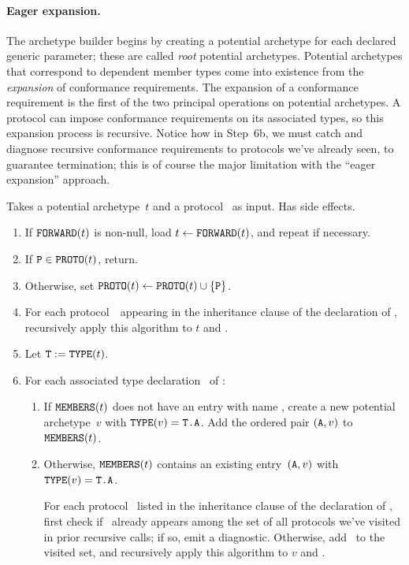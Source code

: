 \documentclass[../generics]{subfiles}
\begin{document}
\paragraph{Eager expansion.}
The archetype builder begins by creating a potential archetype for each declared generic parameter; these are called \emph{root} potential archetypes. Potential archetypes that correspond to dependent member types come into existence from the \emph{expansion} of conformance requirements. The expansion of a conformance requirement is the first of the two principal operations on potential archetypes. A protocol can impose conformance requirements on its associated types, so this expansion process is recursive. Notice how in Step~6b, we must catch and diagnose recursive conformance requirements to protocols we've already seen, to guarantee termination; this is of course the major limitation with the ``eager expansion'' approach.

\begin{algorithm}\label{archetype builder expand}
Takes a potential archetype~$t$ and a protocol \tP\ as input. Has side effects.
\begin{enumerate}
\item If $\texttt{FORWARD}(t)$ is non-null, load $t\leftarrow\texttt{FORWARD}(t)$, and repeat if necessary.
\item If $\texttt{P}\in\texttt{PROTO}(t)$, return.
\item Otherwise, set $\texttt{PROTO}(t)\leftarrow \texttt{PROTO}(t)\cup\{\texttt{P}\}$.
\item For each protocol~\tQ\ appearing in the inheritance clause of the declaration of \tP, recursively apply this algorithm to $t$ and \tQ.
\item Let $\texttt{T}:=\texttt{TYPE}(t)$.
\item For each associated type declaration \nA\ of \tP:
\begin{enumerate}
\item If $\texttt{MEMBERS}(t)$ does not have an entry with name \nA, create a new potential archetype~$v$ with $\texttt{TYPE}(v)=\texttt{T.A}$. Add the ordered pair $(\texttt{A}, v)$ to $\texttt{MEMBERS}(t)$.

\item Otherwise, $\texttt{MEMBERS}(t)$ contains an existing entry~$(\texttt{A}, v)$ with $\texttt{TYPE}(v)=\texttt{T.A}$.

For each protocol \tQ\ listed in the inheritance clause of the declaration of \nA, first check if \tQ\ already appears among the set of all protocols we've visited in prior recursive calls; if so, emit a diagnostic. Otherwise, add \tQ\ to the visited set, and recursively apply this algorithm to $v$ and \tQ.
\end{enumerate}
\end{enumerate}
\end{algorithm}
\end{document}
